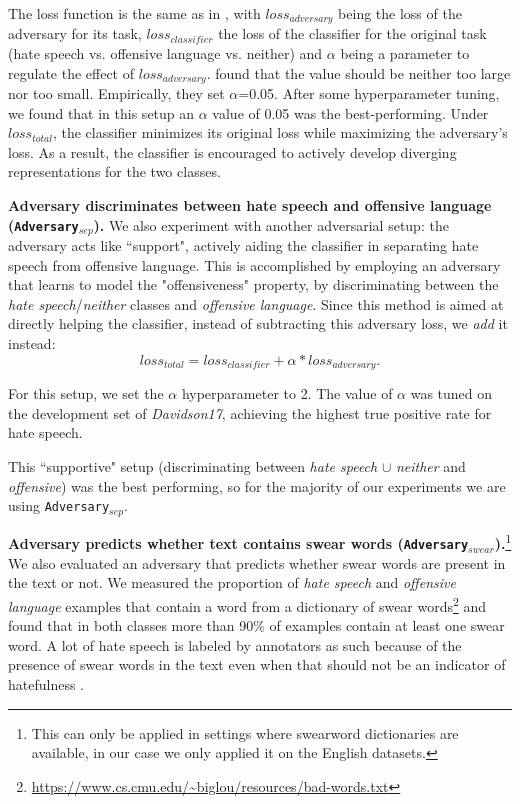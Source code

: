\documentclass[11pt]{article}
\begin{document}
	The loss function is the same as in \citet{wadsworth2018achieving,adversarial_training_aae_hatespeech}, with $loss_{adversary}$ being the loss of the adversary for its task, $loss_{classifier}$ the loss of the classifier for the original task (hate speech vs. offensive language vs. neither) and $\alpha$ being a parameter to regulate the effect of $loss_{adversary}$. \citet{adversarial_training_aae_hatespeech} found that the value should be neither too large nor too small. Empirically, they set $\alpha$=0.05. After some hyperparameter tuning, we found that in this setup an $\alpha$ value of 0.05 was the best-performing.
	Under $loss_{total}$, the classifier minimizes its original loss while maximizing the adversary's loss. As a result, the classifier is encouraged to actively develop diverging representations for the two classes.
	
	\textbf{Adversary discriminates between hate speech and offensive language (\texttt{Adversary$_{sep}$}).} We also experiment with another adversarial setup: the adversary acts like ``support", actively aiding the classifier in separating hate speech from offensive language. This is accomplished by employing an adversary that learns to model the "offensiveness" property, by discriminating between the \textit{hate speech}/\textit{neither} classes and \textit{offensive language}. Since this method is aimed at directly helping the classifier, instead of subtracting this adversary loss, we \textit{add} it instead:
	$$loss_{total}=loss_{classifier}+\alpha*loss_{adversary}.$$
	
	For this setup, we set the $\alpha$ hyperparameter to 2. The value of $\alpha$ was tuned on the development set of \textit{Davidson17}, achieving the highest true positive rate for hate speech.
	
	This ``supportive" setup (discriminating between \textit{hate speech} $\cup$ \textit{neither} and \textit{offensive}) was the best performing, so for the majority of our experiments we are using \texttt{Adversary$_{sep}$}.
	
	\textbf{Adversary predicts whether text contains swear words (\texttt{Adversary$_{swear}$}).}\footnote{This can only be applied in settings where swearword dictionaries are available, in our case we only applied it on the English datasets.} We also evaluated an adversary that predicts whether swear words are present in the text or not. We measured the proportion of \textit{hate speech} and \textit{offensive language} examples that contain a word from a dictionary of swear words\footnote{\url{https://www.cs.cmu.edu/~biglou/resources/bad-words.txt}} and found that in both classes more than 90\% of examples contain at least one swear word. A lot of hate speech is labeled by annotators as such because of the presence of swear words in the text even when that should not be an indicator of hatefulness \cite{aae_bias_hatespeech}.
	
\end{document}
